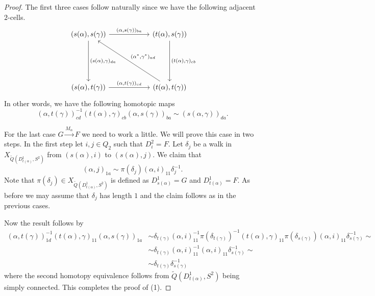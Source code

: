 \documentclass[a4paper, reqno]{amsart}
\theoremstyle{definition}
\begin{document}
\begin{proof}
	The first three cases follow naturally since we have the following adjacent $2$-cells.
	\begin{equation*}
		\begin{tikzcd}[column sep=2cm, row sep=2cm]
			(s(\alpha), s(\gamma)) \arrow[r, "(\alpha{,}s(\gamma))_{ba}"] \arrow[d, "(s(\alpha){,}\gamma)_{da}"] & (t(\alpha), s(\gamma)) \arrow[d, "(t(\alpha){,} \gamma)_{cb}"] \\
			(s(\alpha), t(\gamma)) \arrow[r, "(\alpha{,} t(\gamma))_{cd}"] & (t(\alpha), t(\gamma)) \ar[ul, "(\alpha^*{,} \gamma^*)_{ad}", swap]
		\end{tikzcd}
	\end{equation*}
	In other words, we have the following homotopic maps
	\begin{equation*}
		(\alpha, t(\gamma))_{cd}^{-1} (t(\alpha), \gamma)_{cb} (\alpha, s(\gamma))_{ba} \sim (s(\alpha, \gamma))_{da}.
	\end{equation*}

	For the last case $G\xrightarrow{M_\alpha}F$ we need to work a little. We will prove this case in two steps. In the first step let $i, j\in Q_2$ such that $D_i^2 = F$. Let $\delta_j$ be a walk in $X_{\tilde{Q}(D_{t(\alpha)}^1, S^2)}$ from $(s(\alpha), i)$ to $(s(\alpha), j)$. We claim that
	\begin{equation*}
		(\alpha, j)_{1a} \sim \pi(\delta_j) (\alpha, i)_{11} \delta_j^{-1}.
	\end{equation*}
	Note that $\pi(\delta_j)\in X_{\tilde{Q}(D_{t(\alpha)}^1, S^2)}$ is defined as $D_{s(\alpha)}^1 = G$ and $D_{t(\alpha)}^1 = F$. As before we may assume that $\delta_j$ has length $1$ and the claim follows as in the previous cases.

	Now the result follows by
	\begin{equation*}
		\begin{aligned}
			(\alpha, t(\gamma))_{1d}^{-1} (t(\alpha), \gamma)_{11} (\alpha, s(\gamma))_{1a} &\sim \delta_{t(\gamma)} (\alpha, i)_{11}^{-1} \pi(\delta_{t(\gamma)})^{-1} (t(\alpha), \gamma)_{11} \pi(\delta_{s(\gamma)}) (\alpha, i)_{11} \delta_{s(\gamma)}^{-1} \sim \\
			&\sim \delta_{t(\gamma)} (\alpha, i)_{11}^{-1} (\alpha, i)_{11} \delta_{s(\gamma)}^{-1} \sim \\
			&\sim \delta_{t(\gamma)} \delta_{s(\gamma)}^{-1}
		\end{aligned}
	\end{equation*}
	where the second homotopy equivalence follows from $\tilde{Q}(D_{t(\alpha)}^1, S^2)$ being simply connected. This completes the proof of (1).


\end{proof}
\end{document}
